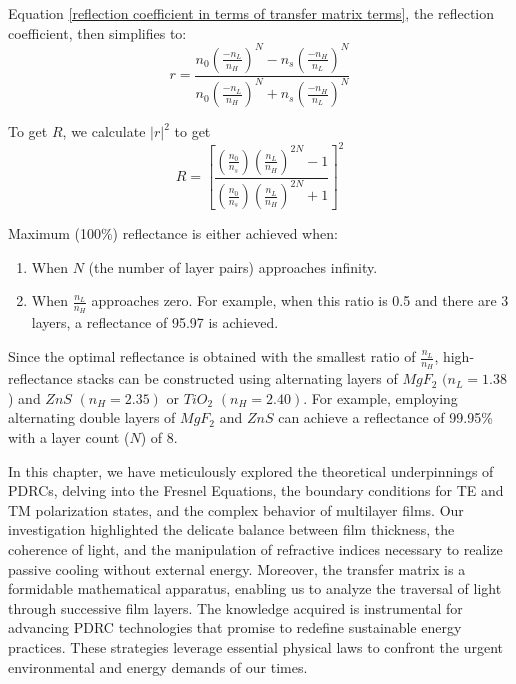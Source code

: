 Equation \ref{reflection coefficient in terms of transfer matrix terms}, the reflection coefficient, then simplifies to:
    \begin{equation}\label{reflection coefficient for double high-reflectance layers}
    r = \frac{n_0\left(\frac{-n_L}{n_H}\right)^N - n_s\left(\frac{-n_H}{n_L}\right)^N}{n_0\left(\frac{-n_L}{n_H}\right)^N + n_s\left(\frac{-n_H}{n_L}\right)^N}
    \end{equation}

To get $R$, we calculate $|r|^2$ to get
    \begin{equation}\label{maximum reflectance equation}
    R = \left[ \frac{ \left( \frac{n_0}{n_s} \right) \left( \frac{n_L}{n_H} \right)^{2N}  - 1 }{  \left( \frac{n_0}{n_s} \right) \left( \frac{n_L}{n_H} \right)^{2N}  + 1     }  \right]^2
    \end{equation}

Maximum (100\%) reflectance is either achieved when:
    \begin{enumerate}
      \item When $N$ (the number of layer pairs) approaches infinity.
      \item When $\frac{n_L}{n_H}$ approaches zero. For example, when this ratio is 0.5 and there are 3 layers, a reflectance of 95.97 is achieved.
    \end{enumerate}
Since the optimal reflectance is obtained with the smallest ratio of $\frac{n_L}{n_H}$, high-reflectance stacks can be constructed using alternating layers of $MgF_2$ $(n_L = 1.38$) and $ZnS$ $(n_H = 2.35)$ or $TiO_2$ $(n_H = 2.40)$. For example, employing alternating double layers of $MgF_2$ and $ZnS$ can achieve a reflectance of 99.95\% with a layer count ($N$) of 8.

In this chapter, we have meticulously explored the theoretical underpinnings of PDRCs, delving into the Fresnel Equations, the boundary conditions for TE and TM polarization states, and the complex behavior of multilayer films. Our investigation highlighted the delicate balance between film thickness, the coherence of light, and the manipulation of refractive indices necessary to realize passive cooling without external energy. Moreover, the transfer matrix is a formidable mathematical apparatus, enabling us to analyze the traversal of light through successive film layers. The knowledge acquired is instrumental for advancing PDRC technologies that promise to redefine sustainable energy practices. These strategies leverage essential physical laws to confront the urgent environmental and energy demands of our times.
